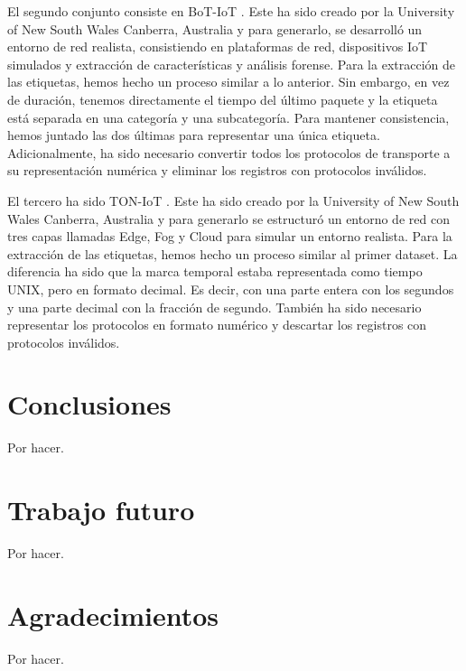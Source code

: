 \documentclass[10pt,a4paper,twoside]{article}
\begin{document}
\begin{multicols}{2}
    El segundo conjunto consiste en BoT-IoT \cite{DBLP:journals/corr/abs-1811-00701}. Este ha sido creado por la University of New South Wales Canberra, Australia y para generarlo, se desarrolló un entorno de red realista, consistiendo en plataformas de red, dispositivos IoT simulados y extracción de características y análisis forense. Para la extracción de las etiquetas, hemos hecho un proceso similar a lo anterior. Sin embargo, en vez de duración, tenemos directamente el tiempo del último paquete y la etiqueta está separada en una categoría y una subcategoría. Para mantener consistencia, hemos juntado las dos últimas para representar una única etiqueta. Adicionalmente, ha sido necesario convertir todos los protocolos de transporte a su representación numérica y eliminar los registros con protocolos inválidos.
    
    El tercero ha sido TON-IoT \cite{MOUSTAFA2021102994}. Este ha sido creado por la University of New South Wales Canberra, Australia y para generarlo se estructuró un entorno de red con tres capas llamadas Edge, Fog y Cloud para simular un entorno realista. Para la extracción de las etiquetas, hemos hecho un proceso similar al primer dataset. La diferencia ha sido que la marca temporal estaba representada como tiempo UNIX, pero en formato decimal. Es decir, con una parte entera con los segundos y una parte decimal con la fracción de segundo. También ha sido necesario representar los protocolos en formato numérico y descartar los registros con protocolos inválidos.





    \section{Conclusiones} \label{conclusiones}

    Por hacer.

    \section{Trabajo futuro} \label{tabajofuturo}

    Por hacer.

    \section{Agradecimientos} \label{agradecimientos}

    Por hacer.

    

\end{multicols}
\end{document}
